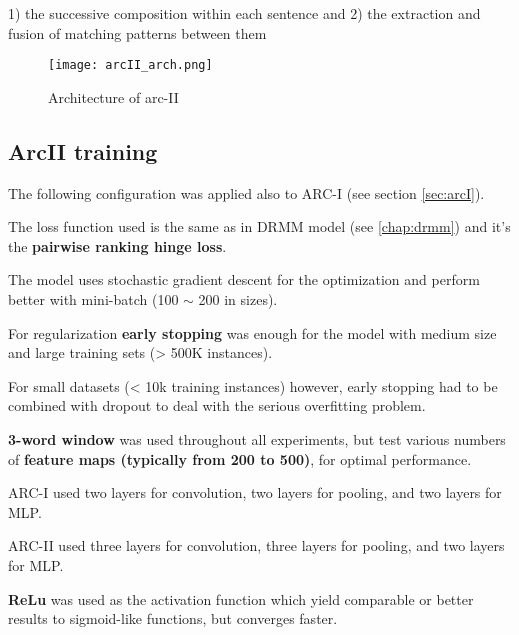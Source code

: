 1) the successive composition within each sentence and
2) the extraction and fusion of matching patterns between them

\begin{figure}[H]
  \centering
  \texttt{[image: arcII\_arch.png]}
  \caption{Architecture of arc-II}
  \label{fig:arcII_arch}
\end{figure}

\subsection{ArcII training}

The following configuration was applied also to ARC-I (see section \ref{sec:arcI}).

The loss function used is the same as in DRMM model (see \ref{chap:drmm}) and
it's the \textbf{pairwise ranking hinge loss}.

The model uses stochastic gradient descent for the optimization and perform
better with mini-batch (100 $\sim$ 200 in sizes).

For regularization \textbf{early stopping} was enough for the model with medium size
and large training sets (> 500K instances).

For small datasets (< 10k training instances) however, early stopping had to
be combined with dropout to deal with the serious overfitting problem.

\textbf{3-word window} was used throughout all experiments, but test various numbers of
\textbf{feature maps (typically from 200 to 500)}, for optimal performance.

ARC-I used two layers for convolution, two layers for pooling, and two layers
for MLP.

ARC-II used three layers for convolution, three layers for pooling, and two layers
for MLP.

\textbf{ReLu} was used as the activation function which yield comparable or better
results to sigmoid-like functions, but converges faster.
